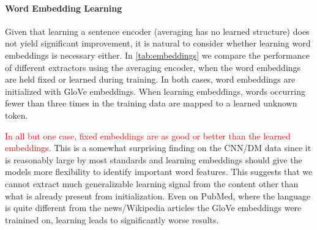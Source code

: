 




\paragraph{Word Embedding Learning}
 Given that learning a sentence encoder (averaging has no learned structure)
 does not yield significant improvement, it is natural to consider whether
 learning word embeddings is necessary either. 
 In \autoref{tab:embeddings} we compare the performance of different extractors
 using the averaging encoder, when the word embeddings are held fixed or 
 learned during training. In both cases, word embeddings are initialized with
 GloVe embeddings.
 When learning embeddings, words occurring 
 fewer than three times in the training data are mapped to a learned unknown
 token.
 
 \textcolor{red}{In all but one case,
fixed embeddings are as good or better than the learned embeddings.}
This is a somewhat surprising finding on the CNN/DM data since it is reasonably
large by most standards and learning embeddings should give the models more
flexibility to identify important word features. 
This suggests that we cannot extract much generalizable learning signal 
from the content other than what is already present from initialization. 
Even on PubMed, where the language is quite different from the news/Wikipedia
articles the GloVe embeddings were trainined on, learning leads to 
significantly worse results.


